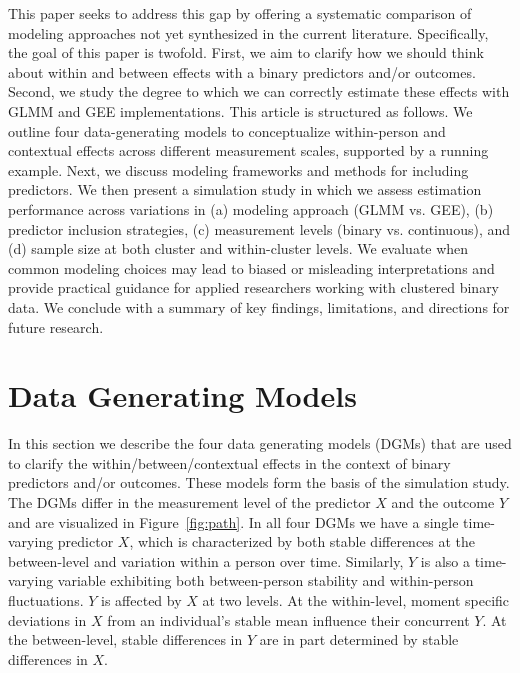 
This paper seeks to address this gap by offering a systematic comparison of modeling approaches not yet synthesized in the current literature. Specifically, the goal of this paper is twofold. First, we aim to clarify how we should think about within and between effects with a binary predictors and/or outcomes. Second, we study the degree to which we can correctly estimate these effects with GLMM and GEE implementations. This article is structured as follows. We outline four data-generating models to conceptualize within-person and contextual effects across different measurement scales, supported by a running example. Next, we discuss modeling frameworks and methods for including predictors. We then present a simulation study in which we assess estimation performance across variations in (a) modeling approach (GLMM vs. GEE), (b) predictor inclusion strategies, (c) measurement levels (binary vs. continuous), and (d) sample size at both cluster and within-cluster levels. We evaluate when common modeling choices may lead to biased or misleading interpretations and provide practical guidance for applied researchers working with clustered binary data. We conclude with a summary of key findings, limitations, and directions for future research. 

\section{Data Generating Models}

In this section we describe the four data generating models (DGMs) that are used to clarify the within/between/contextual effects in the context of binary predictors and/or outcomes. These models form the basis of the simulation study. The DGMs differ in the measurement level of the predictor $X$ and the outcome $Y$ and are visualized in Figure~\ref{fig:path}. In all four DGMs we have a single time-varying predictor $X$, which is characterized by both stable differences at the between-level and variation within a person over time. Similarly, $Y$ is also a time-varying variable exhibiting both between-person stability and within-person fluctuations. $Y$ is affected by $X$ at two levels. At the within-level, moment specific deviations in \( X \) from an individual's stable mean influence their concurrent $Y$. At the between-level, stable differences in $Y$ are in part determined by stable differences in $X$.

